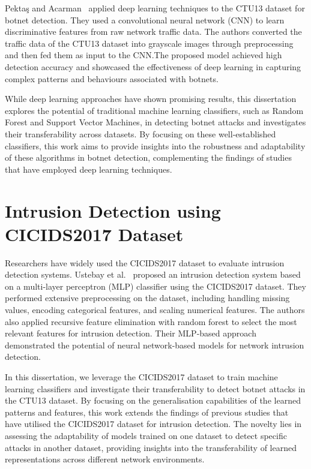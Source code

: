 Pektaş and Acarman~\cite{pektacs2019deep} applied deep learning techniques to the CTU13 dataset for botnet detection. They used a convolutional neural network (CNN) to learn discriminative features from raw network traffic data. The authors converted the traffic data of the CTU13 dataset into grayscale images through preprocessing and then fed them as input to the CNN.\@ The proposed model achieved high detection accuracy and showcased the effectiveness of deep learning in capturing complex patterns and behaviours associated with botnets.

While deep learning approaches have shown promising results, this dissertation explores the potential of traditional machine learning classifiers, such as Random Forest and Support Vector Machines, in detecting botnet attacks and investigates their transferability across datasets. By focusing on these well-established classifiers, this work aims to provide insights into the robustness and adaptability of these algorithms in botnet detection, complementing the findings of studies that have employed deep learning techniques.

\section{Intrusion Detection using CICIDS2017 Dataset}

Researchers have widely used the CICIDS2017 dataset to evaluate intrusion detection systems. Ustebay et al.~\cite{ustebay2018intrusion} proposed an intrusion detection system based on a multi-layer perceptron (MLP) classifier using the CICIDS2017 dataset. They performed extensive preprocessing on the dataset, including handling missing values, encoding categorical features, and scaling numerical features. The authors also applied recursive feature elimination with random forest to select the most relevant features for intrusion detection. Their MLP-based approach demonstrated the potential of neural network-based models for network intrusion detection.

In this dissertation, we leverage the CICIDS2017 dataset to train machine learning classifiers and investigate their transferability to detect botnet attacks in the CTU13 dataset. By focusing on the generalisation capabilities of the learned patterns and features, this work extends the findings of previous studies that have utilised the CICIDS2017 dataset for intrusion detection. The novelty lies in assessing the adaptability of models trained on one dataset to detect specific attacks in another dataset, providing insights into the transferability of learned representations across different network environments.

